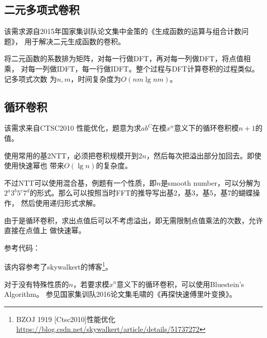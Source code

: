 \subsection{二元多项式卷积}
该需求源自2015年国家集训队论文集中金策的《生成函数的运算与组合计数问题》，
用于解决二元生成函数的卷积。

将二元函数的系数排为矩阵，对每一行做DFT，再对每一列做DFT，将点值相乘，
对每一列做IDFT，每一行做IDFT。整个过程与DFT计算卷积的过程类似。记多项式次数
为$n,m$，时间复杂度为$O(nm\lg nm)$。
\subsection{循环卷积}
该需求来自CTSC2010 性能优化，题意为求$ab^C$在模$x^n$意义下的循环卷积模$n+1$的值。

使用常用的基2NTT，必须把卷积规模开到$2n$，然后每次把溢出部分加回去。即使使用快速幂也
带来$O(\lg n)$的复杂度。

不过NTT可以使用混合基，例题有一个性质，即$n$是smooth number，可以分解为
$2^a3^b5^c7^d$的形式。那么可以按照当时FFT的推导写出基2，基3，基5，基7的蝴蝶操作，
然后使用递归形式求解。


由于是循环卷积，求出点值后可以不考虑溢出，即无需限制点值乘法的次数，允许直接在点值上
做快速幂。

参考代码：


该内容参考了skywalkert的博客\footnote{
    BZOJ 1919 [Ctsc2010]性能优化\\
    \url{https://blog.csdn.net/skywalkert/article/details/51737272}
}。

对于没有特殊性质的$n$，若要求模$x^n$意义下的循环卷积，可以使用Bluestein’s Algorithm。
参见国家集训队2016论文集毛啸的《再探快速傅里叶变换》。

